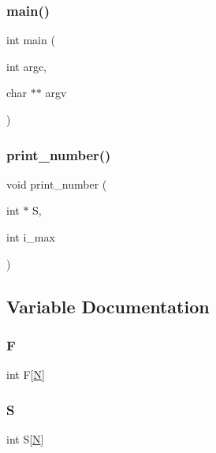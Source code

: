 \mbox{\label{fibonacci_8_c_a3c04138a5bfe5d72780bb7e82a18e627}} 
\subsubsection{\texorpdfstring{main()}{main()}}
{\footnotesize\ttfamily int main (\begin{DoxyParamCaption}\item[{int}]{argc,  }\item[{char $\ast$$\ast$}]{argv }\end{DoxyParamCaption})}

\mbox{\label{fibonacci_8_c_ae71ac5a6ea382e5a64756750b12e8950}} 
\subsubsection{\texorpdfstring{print\+\_\+number()}{print\_number()}}
{\footnotesize\ttfamily void print\+\_\+number (\begin{DoxyParamCaption}\item[{int $\ast$}]{S,  }\item[{int}]{i\+\_\+max }\end{DoxyParamCaption})}



\subsection{Variable Documentation}
\mbox{\label{fibonacci_8_c_ab78443a75edcfbbaa1be74fc5d94ec1d}} 
\subsubsection{\texorpdfstring{F}{F}}
{\footnotesize\ttfamily int F\mbox{[}\mbox{\hyperlink{_a_p_p_s_2_t_d_o_2packing_8_c_a0240ac851181b84ac374872dc5434ee4}{N}}\mbox{]}}

\mbox{\label{fibonacci_8_c_aa07280b20c7249c2d094cb7d90a2afde}} 
\subsubsection{\texorpdfstring{S}{S}}
{\footnotesize\ttfamily int S\mbox{[}\mbox{\hyperlink{_a_p_p_s_2_t_d_o_2packing_8_c_a0240ac851181b84ac374872dc5434ee4}{N}}\mbox{]}}

